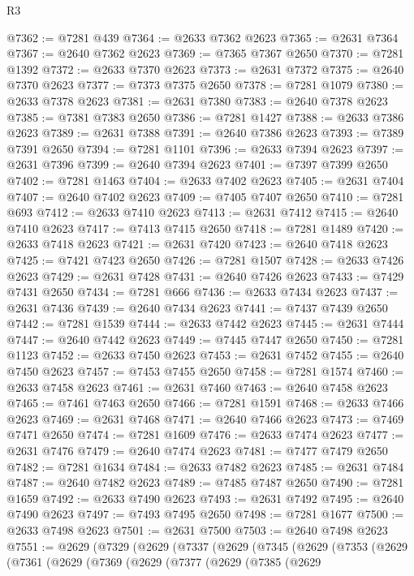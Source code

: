 \begin{lexlean}{R3}
\begin{coremodule}
@7362 := @7281 @439
@7364 := @2633 @7362 @2623
@7365 := @2631 @7364
@7367 := @2640 @7362 @2623
@7369 := @7365 @7367 @2650
@7370 := @7281 @1392
@7372 := @2633 @7370 @2623
@7373 := @2631 @7372
@7375 := @2640 @7370 @2623
@7377 := @7373 @7375 @2650
@7378 := @7281 @1079
@7380 := @2633 @7378 @2623
@7381 := @2631 @7380
@7383 := @2640 @7378 @2623
@7385 := @7381 @7383 @2650
@7386 := @7281 @1427
@7388 := @2633 @7386 @2623
@7389 := @2631 @7388
@7391 := @2640 @7386 @2623
@7393 := @7389 @7391 @2650
@7394 := @7281 @1101
@7396 := @2633 @7394 @2623
@7397 := @2631 @7396
@7399 := @2640 @7394 @2623
@7401 := @7397 @7399 @2650
@7402 := @7281 @1463
@7404 := @2633 @7402 @2623
@7405 := @2631 @7404
@7407 := @2640 @7402 @2623
@7409 := @7405 @7407 @2650
@7410 := @7281 @693
@7412 := @2633 @7410 @2623
@7413 := @2631 @7412
@7415 := @2640 @7410 @2623
@7417 := @7413 @7415 @2650
@7418 := @7281 @1489
@7420 := @2633 @7418 @2623
@7421 := @2631 @7420
@7423 := @2640 @7418 @2623
@7425 := @7421 @7423 @2650
@7426 := @7281 @1507
@7428 := @2633 @7426 @2623
@7429 := @2631 @7428
@7431 := @2640 @7426 @2623
@7433 := @7429 @7431 @2650
@7434 := @7281 @666
@7436 := @2633 @7434 @2623
@7437 := @2631 @7436
@7439 := @2640 @7434 @2623
@7441 := @7437 @7439 @2650
@7442 := @7281 @1539
@7444 := @2633 @7442 @2623
@7445 := @2631 @7444
@7447 := @2640 @7442 @2623
@7449 := @7445 @7447 @2650
@7450 := @7281 @1123
@7452 := @2633 @7450 @2623
@7453 := @2631 @7452
@7455 := @2640 @7450 @2623
@7457 := @7453 @7455 @2650
@7458 := @7281 @1574
@7460 := @2633 @7458 @2623
@7461 := @2631 @7460
@7463 := @2640 @7458 @2623
@7465 := @7461 @7463 @2650
@7466 := @7281 @1591
@7468 := @2633 @7466 @2623
@7469 := @2631 @7468
@7471 := @2640 @7466 @2623
@7473 := @7469 @7471 @2650
@7474 := @7281 @1609
@7476 := @2633 @7474 @2623
@7477 := @2631 @7476
@7479 := @2640 @7474 @2623
@7481 := @7477 @7479 @2650
@7482 := @7281 @1634
@7484 := @2633 @7482 @2623
@7485 := @2631 @7484
@7487 := @2640 @7482 @2623
@7489 := @7485 @7487 @2650
@7490 := @7281 @1659
@7492 := @2633 @7490 @2623
@7493 := @2631 @7492
@7495 := @2640 @7490 @2623
@7497 := @7493 @7495 @2650
@7498 := @7281 @1677
@7500 := @2633 @7498 @2623
@7501 := @2631 @7500
@7503 := @2640 @7498 @2623
@7551 := @2629
    (@7329
      (@2629
        (@7337
          (@2629
            (@7345
              (@2629
                (@7353
                  (@2629
                    (@7361
                      (@2629
                        (@7369
                          (@2629
                            (@7377
                              (@2629
                                (@7385
                                  (@2629

\end{coremodule}
\end{lexlean}
